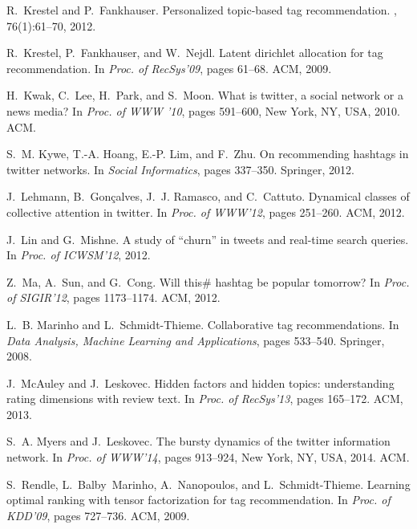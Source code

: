 \documentclass{sig-alternate-05-2015}
\begin{document}
\begin{thebibliography}{10}
R.~Krestel and P.~Fankhauser.
\newblock Personalized topic-based tag recommendation.
, 76(1):61--70, 2012.

R.~Krestel, P.~Fankhauser, and W.~Nejdl.
\newblock Latent dirichlet allocation for tag recommendation.
\newblock In {\em Proc. of RecSys'09}, pages 61--68. ACM, 2009.

H.~Kwak, C.~Lee, H.~Park, and S.~Moon.
\newblock What is twitter, a social network or a news media?
\newblock In {\em Proc. of WWW '10}, pages 591--600, New York, NY, USA, 2010.
  ACM.

S.~M. Kywe, T.-A. Hoang, E.-P. Lim, and F.~Zhu.
\newblock On recommending hashtags in twitter networks.
\newblock In {\em Social Informatics}, pages 337--350. Springer, 2012.

J.~Lehmann, B.~Gon{\c{c}}alves, J.~J. Ramasco, and C.~Cattuto.
\newblock Dynamical classes of collective attention in twitter.
\newblock In {\em Proc. of WWW'12}, pages 251--260. ACM, 2012.

J.~Lin and G.~Mishne.
\newblock A study of ``churn'' in tweets and real-time search queries.
\newblock In {\em Proc. of ICWSM'12}, 2012.

Z.~Ma, A.~Sun, and G.~Cong.
\newblock Will this\# hashtag be popular tomorrow?
\newblock In {\em Proc. of SIGIR'12}, pages 1173--1174. ACM, 2012.

L.~B. Marinho and L.~Schmidt-Thieme.
\newblock Collaborative tag recommendations.
\newblock In {\em Data Analysis, Machine Learning and Applications}, pages
  533--540. Springer, 2008.

J.~McAuley and J.~Leskovec.
\newblock Hidden factors and hidden topics: understanding rating dimensions
  with review text.
\newblock In {\em Proc. of RecSys'13}, pages 165--172. ACM, 2013.

S.~A. Myers and J.~Leskovec.
\newblock The bursty dynamics of the twitter information network.
\newblock In {\em Proc. of WWW'14}, pages 913--924, New York, NY, USA, 2014.
  ACM.

S.~Rendle, L.~Balby~Marinho, A.~Nanopoulos, and L.~Schmidt-Thieme.
\newblock Learning optimal ranking with tensor factorization for tag
  recommendation.
\newblock In {\em Proc. of KDD'09}, pages 727--736. ACM, 2009.


\end{thebibliography}
\end{document}
